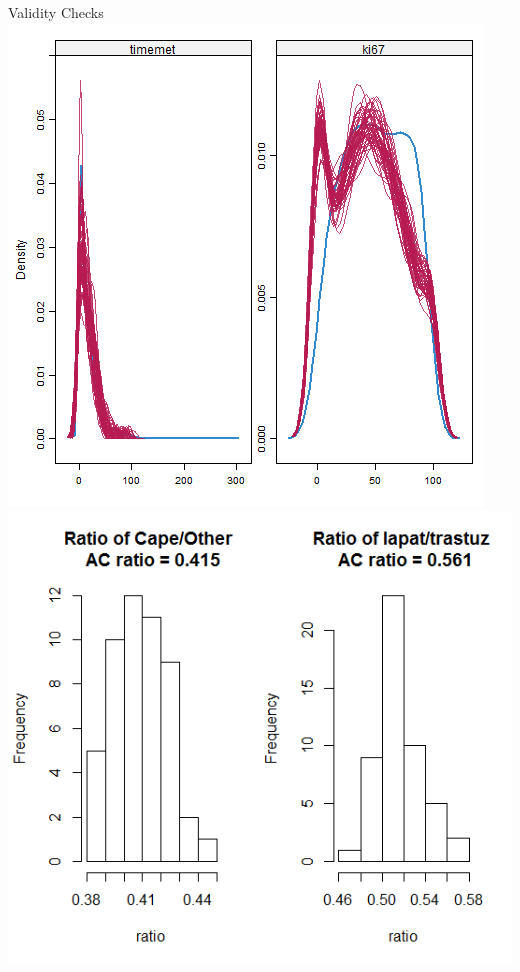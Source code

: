 \begin{frame}{Validity Checks}
\includegraphics[width=.5\textwidth]{cont_densplot}%
\includegraphics[width=.5\textwidth]{cape_lapat_ratio} 
\end{frame}

